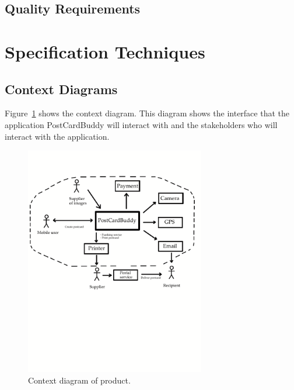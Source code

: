 \documentclass[10pt,a4paper]{article}
\begin{document}
\subsection{Quality Requirements}








\section{Specification Techniques}
\subsection{Context Diagrams}
Figure~\ref{fig:context} shows the context diagram. This diagram shows the interface that the application PostCardBuddy will interact with and the stakeholders who will interact with the application.

\begin{figure}[h!]
\centering
\includegraphics[width=0.7\textwidth]{ContextDiagram2.pdf}
\caption{Context diagram of product.}
\label{fig:context}
\end{figure}
\end{document}

